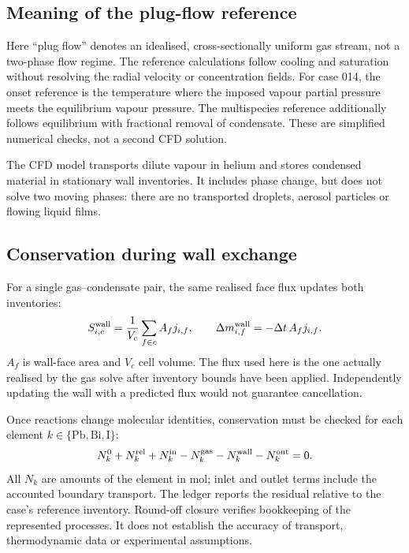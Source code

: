 \documentclass[10pt,a4paper]{article}
\begin{document}
\subsection{Meaning of the plug-flow reference}
Here ``plug flow'' denotes an idealised, cross-sectionally uniform gas
stream, not a two-phase flow regime. The reference calculations follow
cooling and saturation without resolving the radial velocity or
concentration fields. For case 014, the onset reference is the temperature
where the imposed vapour partial pressure meets the equilibrium vapour
pressure. The multispecies reference additionally follows equilibrium
with fractional removal of condensate. These are simplified numerical
checks, not a second CFD solution.

The CFD model transports dilute vapour in helium and stores condensed
material in stationary wall inventories. It includes phase change, but
does not solve two moving phases: there are no transported droplets,
aerosol particles or flowing liquid films.

\clearpage
\subsection{Conservation during wall exchange}
For a single gas--condensate pair, the same realised face flux updates
both inventories:
\begin{equation}
 S_{i,c}^{\rm wall}=\frac{1}{V_c}\sum_{f\in c}A_fj_{i,f},\qquad
 \Delta m_{i,f}^{\rm wall}=-\Delta t\,A_fj_{i,f}.
 \label{eq:pair}
\end{equation}
$A_f$ is wall-face area and $V_c$ cell volume. The flux used here is the
one actually realised by the gas solve after inventory bounds have been
applied. Independently updating the wall with a predicted flux would not
guarantee cancellation.

Once reactions change molecular identities, conservation must be checked
for each element $k\in\{\mathrm{Pb},\mathrm{Bi},\mathrm I\}$:
\begin{equation}
 N_k^{0}+N_k^{\rm rel}+N_k^{\rm in}
 -N_k^{\rm gas}-N_k^{\rm wall}-N_k^{\rm out}=0.
 \label{eq:ledger}
\end{equation}
All $N_k$ are amounts of the element in mol; inlet and outlet terms
include the accounted boundary transport. The ledger reports the residual
relative to the case's reference inventory. Round-off closure verifies
bookkeeping of the represented processes. It does not establish the
accuracy of transport, thermodynamic data or experimental assumptions.
\end{document}
